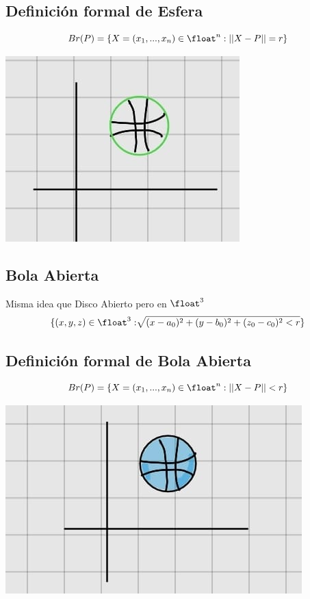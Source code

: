 \documentclass[10pt,a4paper]{article}
\begin{document}
\subsection*{Definición formal de Esfera}
\[ Br(P) = \{X = (x_{1}, ..., x_{n}) \in \float^{n} : ||X-P|| = r\}\]
\begin{center}
    \begin{minipage}[b]{0.3\textwidth}
        \includegraphics[width=\linewidth]{assets/esfera.jpg}
        \centering
        \label{fig:esfera}
    \end{minipage}
\end{center}
\subsection*{Bola Abierta}
Misma idea que Disco Abierto pero en $\float^{3}$
\[\{(x, y, z) \in \float^{3}: \sqrt[]{(x - a_{0})^{2} + (y - b_{0})^{2} + (z_{0} - c_{0})^{2} < r}\}\] 
\subsection*{Definición formal de Bola Abierta}
\[ Br(P) = \{X = (x_{1}, ..., x_{n}) \in \float^{n} : ||X-P|| < r\}\]
\begin{center}
    \begin{minipage}[b]{0.3\textwidth}
        \includegraphics[width=\linewidth]{assets/bola_abierta.jpg}
        \centering
        \label{fig:bola_abierta}
    \end{minipage}
\end{center}
\end{document}
